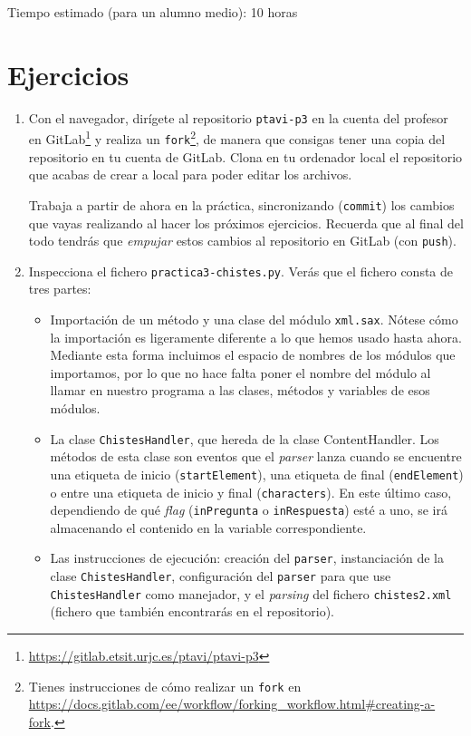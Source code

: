 \documentclass[11pt,a4paper]{article}
\newcommand{\finejercicio}{
  \begin{footnotesize}
    [Al terminar el ejercicio es recomendable hacer \texttt{commit} de los ficheros modificados]
  \end{footnotesize}
}
\begin{document}
Tiempo estimado (para un alumno medio): 10 horas

\section{Ejercicios}

\begin{enumerate}
    \item Con el navegador, dirígete al repositorio \texttt{ptavi-p3} en la cuenta del profesor en GitLab\footnote{\url{https://gitlab.etsit.urjc.es/ptavi/ptavi-p3}} y realiza un \texttt{fork}\footnote{Tienes instrucciones de cómo realizar un \texttt{fork} en \url{https://docs.gitlab.com/ee/workflow/forking_workflow.html#creating-a-fork}.}, de manera que consigas tener una copia del repositorio en tu cuenta de GitLab. Clona en tu ordenador local el repositorio que acabas de crear a local para poder editar los archivos.

  Trabaja a partir de ahora en la práctica, sincronizando (\texttt{commit}) los cambios que vayas realizando al hacer los próximos ejercicios. Recuerda que al final del todo tendrás que \emph{empujar} estos cambios al repositorio en GitLab (con \texttt{push}).


  \item Inspecciona el fichero \texttt{practica3-chistes.py}. Verás que el fichero consta de tres partes:
  \begin{itemize}
    \item Importación de un método y una clase del módulo \texttt{xml.sax}. Nótese cómo la importación es ligeramente diferente a lo que hemos usado hasta ahora. Mediante esta forma incluimos el espacio de nombres de los módulos que importamos, por lo que no hace falta poner el nombre del módulo al llamar en nuestro programa a las clases, métodos y variables de esos módulos.
    \item La clase \texttt{ChistesHandler}, que hereda de la clase ContentHandler. Los métodos de esta clase son eventos que el \emph{parser} lanza cuando se encuentre una etiqueta de inicio (\texttt{startElement}), una etiqueta de final (\texttt{endElement}) o entre una etiqueta de inicio y final (\texttt{characters}). En este último caso, dependiendo de qué \emph{flag} (\texttt{inPregunta} o \texttt{inRespuesta}) esté a uno, se irá almacenando el contenido en la variable correspondiente.
    \item Las instrucciones de ejecución: creación del \texttt{parser}, instanciación de la clase \texttt{ChistesHandler}, configuración del \texttt{parser} para que use \texttt{ChistesHandler} como manejador, y el \emph{parsing} del fichero \texttt{chistes2.xml} (fichero que también encontrarás en el repositorio).
  \end{itemize}


\end{enumerate}
\end{document}
